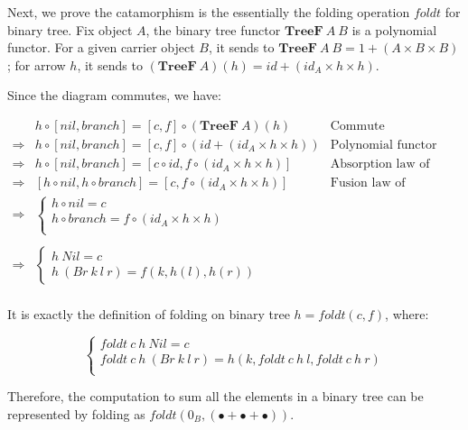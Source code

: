 \documentclass{article}
\begin{document}
\begin{example}
Next, we prove the catamorphism is the essentially the folding operation $foldt$ for binary tree. Fix object $A$, the binary tree functor $\mathbf{TreeF}\ A\ B$ is a polynomial functor. For a given carrier object $B$, it sends to $\mathbf{TreeF}\ A\ B = 1 + (A \times B \times B)$; for arrow $h$, it sends to $(\mathbf{TreeF}\ A)(h) = id + (id_A \times h \times h)$.

Since the diagram commutes, we have:

\[
\begin{array}{rll}
            & h \circ [nil, branch] = [c, f] \circ (\mathbf{TreeF}\ A)(h) & \text{Commute} \\
\Rightarrow & h \circ [nil, branch] = [c, f] \circ (id + (id_A \times h \times h)) & \text{Polynomial functor} \\
\Rightarrow & h \circ [nil, branch] = [c \circ id, f \circ (id_A \times h \times h)] & \text{Absorption law of coproduct on the right} \\
\Rightarrow & [h \circ nil, h \circ branch] = [c, f \circ (id_A \times h \times h)] & \text{Fusion law of coproduct on the left} \\
\Rightarrow &
  \begin{cases}
    h \circ nil = c \\
    h \circ branch = f \circ (id_A \times h \times h) \\
  \end{cases} & \\
\\
\Rightarrow &
  \begin{cases}
    h\ Nil = c \\
    h\ (Br\ k\ l\ r) = f(k, h(l), h(r))
  \end{cases} & \\
\end{array}
\]

It is exactly the definition of folding on binary tree $h = foldt(c, f)$, where:

\[
\begin{cases}
foldt\ c\ h\ Nil = c \\
foldt\ c\ h\ (Br\ k\ l\ r) = h(k, foldt\ c\ h\ l, foldt\ c\ h\ r) \\
\end{cases}
\]

Therefore, the computation to sum all the elements in a binary tree can be represented by folding as $foldt(0_B, (\bullet + \bullet + \bullet))$.
\end{example}
\end{document}
